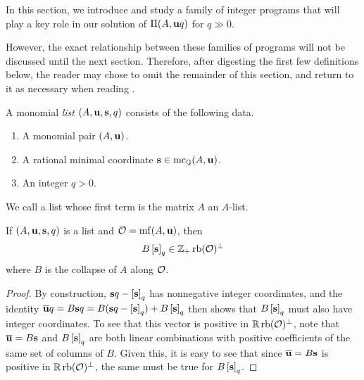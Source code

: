 \documentclass[11pt]{amsart}
\renewcommand{\!}[1]{{\color{red}\text{$\star$\,}#1\,$\star$}}
\newcommand{\ol}[1]{\overline{#1}}
\begin{document}
In this section, we introduce and study a family of integer programs that will play a key role in our solution of $\Pi(A, \mathbf{u}q)$ for $q \gg 0$.    

However, the exact relationship between these families of programs will not be discussed until the next section.  Therefore, after digesting the first few definitions below, the reader may chose to omit the remainder of this section, and return to it as necessary when reading .  

\begin{definition}
A monomial \emph{list} $(A, \mathbf{u}, \mathbf{s}, q)$ consists of the following data.
\begin{enumerate}
\item A monomial pair $(A, \mathbf{u})$.
\item A rational minimal coordinate $\mathbf{s} \in \operatorname{mc}_{\mathbb{Q}}(A, \mathbf{u})$.
\item An integer $q>0$.
\end{enumerate}
\end{definition}

\begin{definition}
We call a list whose first term is the matrix $A$ an $A$-list.
\end{definition}


\begin{lemma}
\label{tail projection: L}
If $(A, \mathbf{u}, \mathbf{s}, q)$ is a list and $\mathcal{O} = \operatorname{mf}(A, \mathbf{u})$, then 
\[ B\left[ \mathbf{s} \right]_q \in \mathbb{Z}_+ \operatorname{rb}(\mathcal{O})^{\perp} \]
where $B$ is the collapse of $A$ along $\mathcal{O}$.
\end{lemma}

\begin{proof}  By construction, $\mathbf{s}q - \left[ \mathbf{s} \right]_q $ has nonnegative integer coordinates, and the identity 
$\ol{\vv{u}} q =B \vv{s} q = B ( \vv{s}q - \tail{\vv{s}}_q ) +B \tail{\vv{s}}_q$ then shows that $B \left[ \mathbf{s} \right]_q$ must also have integer coordinates.   To see that this vector is positive in $\mathbb{R} \operatorname{rb}(\mathcal{O})^{\perp}$, note that $\ol{\vv{u}} = B \vv{s}$ and $B \left[ \mathbf{s} \right]_q$ are both linear combinations with positive coefficients of the same set of columns of $B$.  Given this, it is easy to see that since $\ol{\vv{u}} = B \vv{s}$ is positive in $\mathbb{R} \operatorname{rb}(\mathcal{O})^{\perp}$, the same must be true for $B \left[ \mathbf{s} \right]_q$.
\end{proof}
\end{document}
